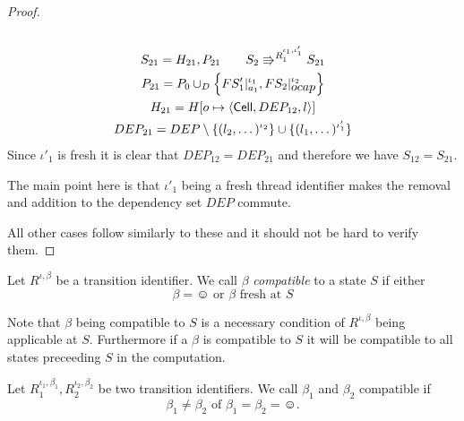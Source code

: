 \begin{proof}
\begin{description}
\begin{equation}
\begin{gathered}
        \end{gathered}
      \end{equation}
      \begin{equation} 
        \begin{gathered}
          S_{21} = H_{21}, P_{21} \quad\quad S_2 \Rrightarrow^{R_1^{\iota_1,
          \iota'_1}} S_{21}
          \\
          P_{21} = P_0 \cup_D \left\{ FS'_1|_{a_1}^{\iota_1},
          FS_2|_{\mbox{$ocap$}}^{\iota_2} \right\} \\
          H_{21} = H[o \mapsto \mbox{$\langle \mbox{$\mathsf{Cell}$}{}, DEP_{12}, l \rangle$}] \\ 
          DEP_{21} = DEP \setminus \{ (l_2, \dots)^{\iota_2} \} \cup \{ (l_1,
          \dots)^{\iota'_1} \} 
        \end{gathered}
      \end{equation}
      Since $\iota'_1$ is fresh it is clear that $DEP_{12} = DEP_{21}$ and
      therefore we have $S_{12} = S_{21}$.
      \begin{remark}
        The main point here is that $\iota'_1$ being a fresh thread identifier
        makes the removal and addition to the dependency set $DEP$ commute.
      \end{remark}
  \end{description}
  All other cases follow similarly to these and it should not be hard to verify
  them.
\end{proof}

\begin{definition} \label{def:betacompat}
  Let $R^{\iota, \beta}$ be a transition
  identifier. We call $\beta$ \emph{compatible} to a state $S$ if either
  \begin{equation*}
    \beta = \smiley \text{ or } \beta \text{ fresh at } S
  \end{equation*}
\end{definition}
\begin{remark}
  Note that $\beta$ being compatible to $S$ is a necessary condition of
  $R^{\iota, \beta}$ being applicable at $S$. Furthermore if a $\beta$ is
  compatible to $S$ it will be compatible to all states preceeding $S$ in the
  computation.
\end{remark}

\begin{definition}
  Let $R_1^{\iota_1, \beta_1}, R_2^{\iota_2, \beta_2}$ be two transition
  identifiers. We call $\beta_1$ and $\beta_2$ compatible if
  \begin{equation*}
    \beta_1 \neq \beta_2 \text{ of } \beta_1 = \beta_2 = \smiley.
  \end{equation*}
\end{definition}


